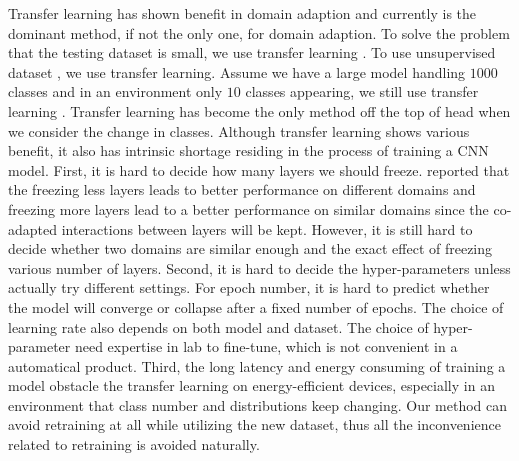 \documentclass{article}
\begin{document}
{%
Transfer learning has shown benefit in domain adaption and currently is the dominant method, if not the only one, for domain adaption. To solve the problem that the testing dataset is small, we use transfer learning \cite{oquab2014learning}. To use unsupervised dataset \cite{doersch2015unsupervised, noroozi2016unsupervised}, we use transfer learning. Assume we have a large model handling $1000$ classes and in an environment only $10$ classes appearing, we still use transfer learning \cite{han2016mcdnn, shen2017fast}. Transfer learning has become the only method off the top of head when we consider the change in classes. Although transfer learning shows various benefit, it also has intrinsic shortage residing in the process of training a CNN model. First, it is hard to decide how many layers we should freeze. \cite{yosinski2014transferable} reported that the freezing less layers leads to better performance on different domains and freezing more layers lead to a better performance on similar domains since the co-adapted interactions between layers will be kept. However, it is still hard to decide whether two domains are similar enough and the exact effect of freezing various number of layers. Second, it is hard to decide the hyper-parameters unless actually try different settings. For epoch number, it is hard to predict whether the model will converge or collapse after a fixed number of epochs. The choice of learning rate also depends on both model and dataset. The choice of hyper-parameter need expertise in lab to fine-tune, which is not convenient in a automatical product. Third, the long latency and energy consuming of training a model obstacle the transfer learning on energy-efficient devices, especially in an environment that class number and distributions keep changing. Our method can avoid retraining at all while utilizing the new dataset, thus all the inconvenience related to retraining is avoided naturally.
}
\end{document}
